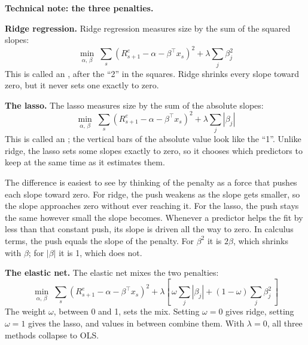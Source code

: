 \begin{technote}
\textbf{Technical note: the three penalties.}

\textbf{Ridge regression.} Ridge regression measures size by the sum of the squared slopes:
\begin{equation}
  \min_{\alpha,\,\beta} \; \sum_{s} \left(R^{e}_{s+1} - \alpha - \beta^{\top} x_s\right)^2 + \lambda \sum_{j} \beta_j^2
  \label{eq:20-ridge}
\end{equation}
This is called an , after the ``2'' in the squares. Ridge shrinks every slope toward zero, but it never sets one exactly to zero.

\textbf{The lasso.} The lasso measures size by the sum of the absolute slopes:
\begin{equation}
  \min_{\alpha,\,\beta} \; \sum_{s} \left(R^{e}_{s+1} - \alpha - \beta^{\top} x_s\right)^2 + \lambda \sum_{j} |\beta_j|
  \label{eq:20-lasso}
\end{equation}
This is called an ; the vertical bars of the absolute value look like the ``1''. Unlike ridge, the lasso sets some slopes exactly to zero, so it chooses which predictors to keep at the same time as it estimates them.

The difference is easiest to see by thinking of the penalty as a force that pushes each slope toward zero. For ridge, the push weakens as the slope gets smaller, so the slope approaches zero without ever reaching it. For the lasso, the push stays the same however small the slope becomes. Whenever a predictor helps the fit by less than that constant push, its slope is driven all the way to zero. In calculus terms, the push equals the slope of the penalty. For $\beta^2$ it is $2\beta$, which shrinks with $\beta$; for $|\beta|$ it is 1, which does not.

\textbf{The elastic net.} The elastic net  mixes the two penalties:
\begin{equation}
  \min_{\alpha,\,\beta} \; \sum_{s} \left(R^{e}_{s+1} - \alpha - \beta^{\top} x_s\right)^2
  + \lambda \left[\, \omega \sum_{j} |\beta_j| + (1-\omega) \sum_{j} \beta_j^2 \,\right]
  \label{eq:20-enet}
\end{equation}
The weight $\omega$, between 0 and 1, sets the mix. Setting $\omega = 0$ gives ridge, setting $\omega = 1$ gives the lasso, and values in between combine them. With $\lambda = 0$, all three methods collapse to OLS.
\end{technote}


